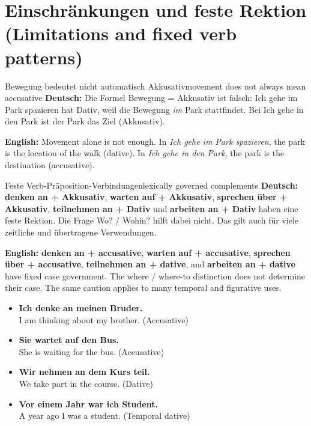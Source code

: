 \documentclass[a4paper,11pt]{article}
\newcommand{\GermanText}[1]{\textbf{Deutsch: }#1\par}
\newcommand{\EnglishText}[1]{{\small\color{SoftGray}\textbf{English: }#1\par}}
\newcommand{\ExampleItem}[2]{\item \textbf{#1}\\{\small\color{SoftGray}#2}}
\begin{document}
\section{Einschränkungen und feste Rektion (Limitations and fixed verb patterns)}
\begin{grammarentry}{Bewegung bedeutet nicht automatisch Akkusativ}{movement does not always mean accusative}
\GermanText{Die Formel \glqq Bewegung = Akkusativ\grqq{} ist falsch: \glqq Ich gehe im Park spazieren\grqq{} hat Dativ, weil die Bewegung \emph{im} Park stattfindet. Bei \glqq Ich gehe in den Park\grqq{} ist der Park das Ziel (Akkusativ).}
\EnglishText{Movement alone is not enough. In \emph{Ich gehe im Park spazieren}, the park is the location of the walk (dative). In \emph{Ich gehe in den Park}, the park is the destination (accusative).}
\end{grammarentry}
\begin{grammarentry}{Feste Verb-Präposition-Verbindungen}{lexically governed complements}
\GermanText{\textbf{denken an + Akkusativ}, \textbf{warten auf + Akkusativ}, \textbf{sprechen über + Akkusativ}, \textbf{teilnehmen an + Dativ} und \textbf{arbeiten an + Dativ} haben eine feste Rektion. Die Frage \glqq Wo? / Wohin?\grqq{} hilft dabei nicht. Das gilt auch für viele zeitliche und übertragene Verwendungen.}
\EnglishText{\textbf{denken an + accusative}, \textbf{warten auf + accusative}, \textbf{sprechen über + accusative}, \textbf{teilnehmen an + dative}, and \textbf{arbeiten an + dative} have fixed case government. The where / where-to distinction does not determine their case. The same caution applies to many temporal and figurative uses.}
\end{grammarentry}
\begin{exbox}
\begin{itemize}
\ExampleItem{Ich denke an meinen Bruder.}{I am thinking about my brother. (Accusative)}
\ExampleItem{Sie wartet auf den Bus.}{She is waiting for the bus. (Accusative)}
\ExampleItem{Wir nehmen an dem Kurs teil.}{We take part in the course. (Dative)}
\ExampleItem{Vor einem Jahr war ich Student.}{A year ago I was a student. (Temporal dative)}
\end{itemize}
\end{exbox}
\end{document}
